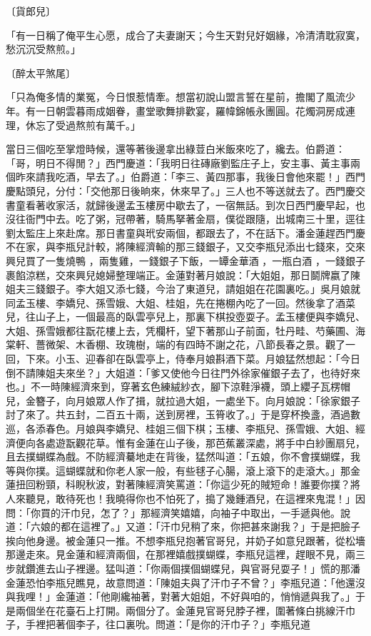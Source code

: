 \begin{showcontents}{}
〔貨郎兒〕

「有一日稱了俺平生心愿，成合了夫妻謝天；今生天對兒好姻緣，冷清清耽寂寞，愁沉沉受熬煎。」

〔醉太平煞尾〕

「只為俺多情的業冤，今日恨惹情牽。想當初說山盟言誓在星前，擔閣了風流少年。有一日朝雲暮雨成姻眷，畫堂歌舞排歡宴，羅幃錦帳永團圓。花燭洞房成連理，休忘了受過熬煎有萬千。」

當日三個吃至掌燈時候，還等著後邊拿出綠荳白米飯來吃了，纔去。伯爵道：「哥，明日不得閒？」西門慶道：「我明日往磚廠劉監庄子上，安主事、黃主事兩個昨來請我吃酒，早去了。」伯爵道：「李三、黃四那事，我後日會他來罷！」西門慶點頭兒，分付：「交他那日後晌來，休來早了。」三人也不等送就去了。西門慶交書童看著收家活，就歸後邊孟玉樓房中歇去了，一宿無話。到次日西門慶早起，也沒往衙門中去。吃了粥，冠帶著，騎馬拏著金扇，僕從跟隨，出城南三十里，逕往劉太監庄上來赴席。那日書童與玳安兩個，都跟去了，不在話下。潘金蓮趕西門慶不在家，與李瓶兒計較，將陳經濟輸的那三錢銀子，又交李瓶兒添出七錢來，交來興兒買了一隻燒鴨 ，兩隻雞，一錢銀子下飯，一罈金華酒 ，一瓶白酒 ，一錢銀子裹餡涼糕，交來興兒媳婦整理端正。金蓮對著月娘說：「大姐姐，那日鬬牌嬴了陳姐夫三錢銀子。李大姐又添七錢，今治了東道兒，請姐姐在花園裏吃。」吳月娘就同孟玉樓、李嬌兒、孫雪娥、大姐、桂姐，先在捲棚內吃了一回。然後拿了酒菜兒，往山子上，一個最高的臥雲亭兒上，那裏下棋投壺耍子。孟玉樓便與李嬌兒、大姐、孫雪娥都往翫花樓上去，凭欄杆，望下著那山子前面，牡丹畦、芍藥圃、海棠軒、薔微架、木香棚、玫瑰樹，端的有四時不謝之花，八節長春之景。觀了一回，下來。小玉、迎春卻在臥雲亭上，侍奉月娘斟酒下菜。月娘猛然想起：「今日倒不請陳姐夫來坐？」大姐道：「爹又使他今日往門外徐家催銀子去了，也待好來也。」不一時陳經濟來到，穿著玄色練絨紗衣，腳下涼鞋淨襪，頭上纓子瓦楞帽兒，金簪子，向月娘眾人作了揖，就拉過大姐，一處坐下。向月娘說：「徐家銀子討了來了。共五封，二百五十兩，送到房裡，玉筲收了。」于是穿杯換盞，酒過數巡，各添春色。月娘與李嬌兒、桂姐三個下棋；玉樓、李瓶兒、孫雪娥、大姐、經濟便向各處遊翫觀花草。惟有金蓮在山子後，那芭蕉叢深處，將手中白紗團扇兒，且去撲蝴蝶為戲。不防經濟驀地走在背後，猛然叫道：「五娘，你不會撲蝴蝶，我等與你撲。這蝴蝶就和你老人家一般，有些毬子心腸，滾上滾下的走滾大。」那金蓮扭回粉頸，科睨秋波，對著陳經濟笑罵道：「你這少死的賊短命！誰要你撲？將人來聽見，敢待死也！我曉得你也不怕死了，搗了幾鍾酒兒，在這裡來鬼混！」因問：「你買的汗巾兒，怎了？」那經濟笑嬉嬉，向袖子中取出，一手遞與他。說道：「六娘的都在這裡了。」又道：「汗巾兒稍了來，你把甚來謝我？」于是把臉子挨向他身邊。被金蓮只一推。不想李瓶兒抱著官哥兒，并奶子如意兒跟著，從松墻那邊走來。見金蓮和經濟兩個，在那裡嬉戲撲蝴蝶，李瓶兒這裡，趕眼不見，兩三步就鑽進去山子裡邊。猛叫道：「你兩個撲個蝴蝶兒，與官哥兒耍子！」慌的那潘金蓮恐怕李瓶兒瞧見，故意問道：「陳姐夫與了汗巾子不曾？」李瓶兒道：「他還沒與我哩！」金蓮道：「他剛纔袖著，對著大姐姐，不好與咱的，悄悄遞與我了。」于是兩個坐在花臺石上打開。兩個分了。金蓮見官哥兒脖子裡，圍著條白挑線汗巾子，手裡把著個李子，往口裏吮。問道：「是你的汗巾子？」李瓶兒道
\end{showcontents}
